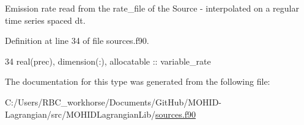 Emission rate read from the rate\+\_\+file of the Source -\/ interpolated on a regular time series spaced dt. 



Definition at line 34 of file sources.\+f90.


\begin{DoxyCode}
34         \textcolor{keywordtype}{real(prec)}, \textcolor{keywordtype}{dimension(:)}, \textcolor{keywordtype}{allocatable} :: variable\_rate
\end{DoxyCode}


The documentation for this type was generated from the following file\+:\begin{DoxyCompactItemize}
\item 
C\+:/\+Users/\+R\+B\+C\+\_\+workhorse/\+Documents/\+Git\+Hub/\+M\+O\+H\+I\+D-\/\+Lagrangian/src/\+M\+O\+H\+I\+D\+Lagrangian\+Lib/\mbox{\hyperlink{sources_8f90}{sources.\+f90}}\end{DoxyCompactItemize}
